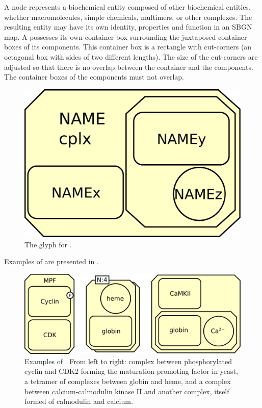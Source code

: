 A  node represents a biochemical entity composed of other biochemical entities, whether macromolecules, simple chemicals, multimers, or other complexes. The resulting entity may have its own identity, properties and function in an SBGN map. A  possesses its own container box surrounding the juxtaposed container boxes of its components.  This container box is a rectangle with cut-corners (an octagonal box with sides of two different lengths).  The size of the cut-corners are adjusted so that there is no overlap between the container and the components.  The container boxes of the components must not overlap.

\begin{figure}[H]
  \centering
  \includegraphics[scale = 0.3]{le_images/complex}
  \caption{The \PD glyph for .}
  \label{fig:complex}
\end{figure}


Examples of  are presented in .

\begin{figure}[H]
  \centering
  \includegraphics[scale = 0.5]{le_images/complex-examples}
  \caption{Examples of . From left to right: complex between phosphorylated cyclin and CDK2 forming the maturation promoting factor in yeast, a tetramer of complexes between globin and heme, and a complex between calcium-calmodulin kinase II and another complex, itself formed of calmodulin and calcium.}
  \label{fig:complex-examples}
\end{figure}


